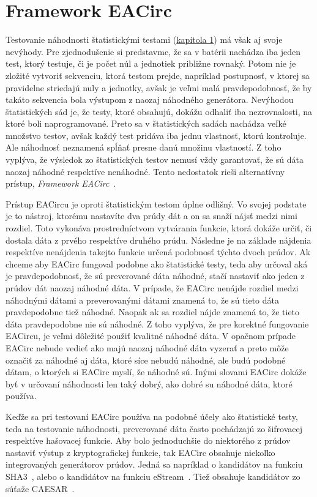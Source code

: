 \chapter{Framework EACirc}
\label{chap:eacirc}

Testovanie náhodnosti štatistickými testami (\hyperref[chap:statistic-tests]{kapitola 1}) má však aj svoje nevýhody. Pre zjednodušenie si predstavme, že sa v batérii nachádza iba jeden test, ktorý testuje, či je počet núl a jednotiek približne rovnaký. Potom nie je zložité vytvoriť sekvenciu, ktorá testom prejde, napríklad postupnosť, v ktorej sa pravidelne striedajú nuly a jednotky, avšak je veľmi malá pravdepodobnosť, že by takáto sekvencia bola výstupom z naozaj náhodného generátora. Nevýhodou štatistických sád je, že testy, ktoré obsahujú, dokážu odhaliť iba nezrovnalosti, na ktoré boli naprogramované. Preto sa v štatistických sadách nachádza veľké množstvo testov, avšak každý test pridáva iba jednu vlastnosť, ktorú kontroluje. Ale náhodnosť neznamená spĺňať presne danú množinu vlastností. Z toho vyplýva, že výsledok zo štatistických testov nemusí vždy garantovať, že sú dáta naozaj náhodné respektíve nenáhodné. Tento nedostatok rieši alternatívny prístup, \textit{Framework EACirc}~\parencite{ukrop-bc}. 

Prístup EACircu je oproti štatistickým testom úplne odlišný. Vo svojej podstate je to nástroj, ktorému nastavíte dva prúdy dát a on sa snaží nájsť medzi nimi rozdiel. Toto vykonáva prostredníctvom vytvárania funkcie, ktorá dokáže určiť, či dostala dáta z prvého respektíve druhého prúdu. Následne je na základe nájdenia respektíve nenájdenia takejto funkcie určená podobnosť týchto dvoch prúdov. Ak chceme aby EACirc fungoval podobne ako štatistické testy, teda aby určoval aká je pravdepodobnosť, že sú preverované dáta náhodné, stačí nastaviť ako jeden z prúdov dát naozaj náhodné dáta. V prípade, že EACirc nenájde rozdiel medzi náhodnými dátami a preverovanými dátami znamená to, že sú tieto dáta pravdepodobne tiež náhodné. Naopak ak sa rozdiel nájde znamená to, že tieto dáta pravdepodobne nie sú náhodné. Z toho vyplýva, že pre korektné fungovanie EACircu, je veľmi dôležité použiť kvalitné náhodné dáta. V opačnom prípade EACirc nebude vedieť ako majú naozaj náhodné dáta vyzerať a preto môže označiť za náhodné aj dáta, ktoré síce nebudú náhodné, ale budú podobné dátam, o ktorých si EACirc myslí, že náhodné sú. Inými slovami EACirc dokáže byť v určovaní náhodnosti len taký dobrý, ako dobré su náhodné dáta, ktoré používa.

Keďže sa pri testovaní EACirc používa na podobné účely ako štatistické testy, teda na testovanie náhodnosti, preverované dáta často pochádzajú zo šifrovacej respektíve hašovacej funkcie. Aby bolo jednoduchšie do niektorého z prúdov nastaviť výstup z kryptografickej funkcie, tak EACirc obsahuje niekoľko integrovaných generátorov prúdov. Jedná sa napríklad o kandidátov na funkciu SHA3~\cite{thesis-dubovec}, alebo o kandidátov na funkciu eStream~\parencite{thesis-pristak}. Tiež obsahuje kandidátov zo súťaže CAESAR~\cite{ukrop-master}. 

